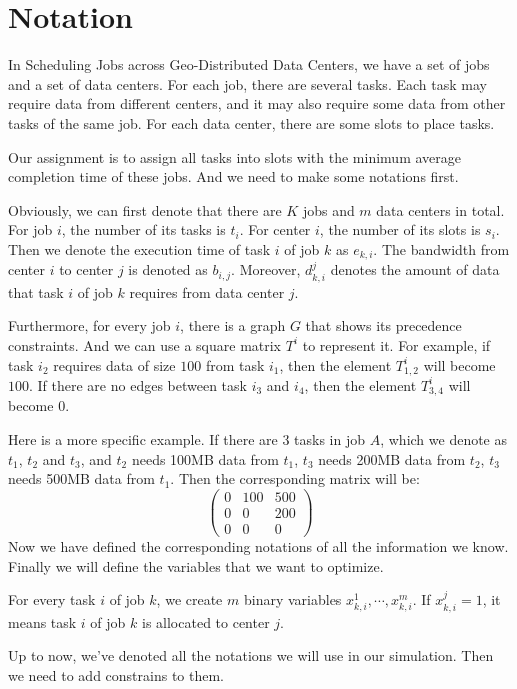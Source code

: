 \documentclass{llncs}
\begin{document}
\section{Notation}

In Scheduling Jobs across Geo-Distributed Data Centers, we have a set of jobs and a set of data centers. For each job, there are several tasks. Each task may require data from different centers, and it may also require some data from other tasks of the same job. For each data center, there are some slots to place tasks.

Our assignment is to assign all tasks into slots with the minimum average completion time of these jobs. And we need to make some notations first.

Obviously, we can first denote that there are $K$ jobs and $m$ data centers in total. For job $i$, the number of its tasks is $t_i$. For center $i$, the number of its slots is $s_i$. Then we denote the execution time of task $i$ of job $k$ as $e_{k,i}$. The bandwidth from center $i$ to center $j$ is denoted as $b_{i,j}$. Moreover, $d_{k,i}^j$ denotes the amount of data that task $i$ of job $k$ requires from data center $j$.

Furthermore, for every job $i$, there is a graph $G$ that shows its precedence constraints. And we can use a square matrix $T^i$ to represent it. For example, if task $i_2$ requires data of size $100$ from task $i_1$, then the element $T_{1,2}^i$ will become $100$. If there are no edges between task $i_3$ and $i_4$, then the element $T_{3,4}^i$ will become $0$.

Here is a more specific example. If there are $3$ tasks in job $A$, which we denote as $t_1$, $t_2$ and $t_3$, and $t_2$ needs 100MB data from $t_1$, $t_3$ needs 200MB data from $t_2$, $t_3$ needs 500MB data from $t_1$. Then the corresponding matrix will be:
$$\begin{pmatrix}
0 & 100 & 500 \\
0 & 0 & 200 \\
0 & 0 & 0
\end{pmatrix}$$
Now we have defined the corresponding notations of all the information we know. Finally we will define the variables that we want to optimize.

For every task $i$ of job $k$, we create $m$ binary variables $x_{k,i}^1,\cdots,x_{k,i}^m$. If $x_{k,i}^j=1$, it means task $i$ of job $k$ is allocated to center $j$.

Up to now, we've denoted all the notations we will use in our simulation. Then we need to add constrains to them.
\end{document}
